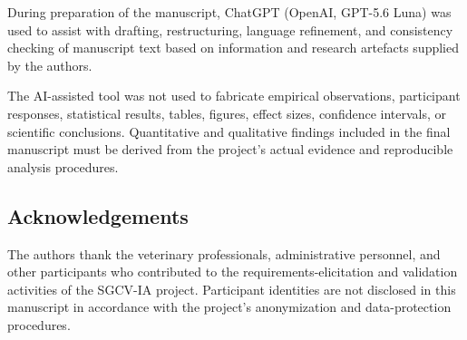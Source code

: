 \documentclass[12pt]{article}
\begin{document}
During preparation of the manuscript, ChatGPT (OpenAI, GPT-5.6 Luna)
was used to assist with drafting, restructuring, language refinement,
and consistency checking of manuscript text based on information and
research artefacts supplied by the authors.

The AI-assisted tool was not used to fabricate empirical observations,
participant responses, statistical results, tables, figures, effect
sizes, confidence intervals, or scientific conclusions. Quantitative
and qualitative findings included in the final manuscript must be
derived from the project's actual evidence and reproducible analysis
procedures.


\subsection*{Acknowledgements}

The authors thank the veterinary professionals, administrative
personnel, and other participants who contributed to the
requirements-elicitation and validation activities of the SGCV-IA
project. Participant identities are not disclosed in this manuscript
in accordance with the project's anonymization and data-protection
procedures.
\end{document}
